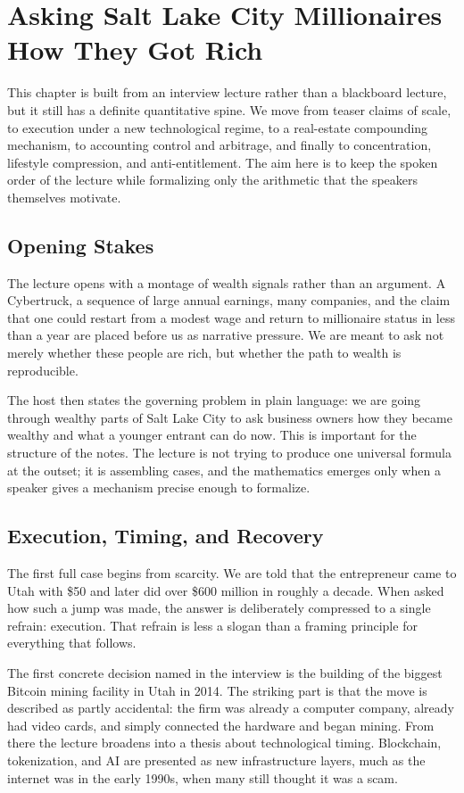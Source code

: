 \chapter{Asking Salt Lake City Millionaires How They Got Rich}

This chapter is built from an interview lecture rather than a blackboard lecture, but it still has a definite quantitative spine. We move from teaser claims of scale, to execution under a new technological regime, to a real-estate compounding mechanism, to accounting control and arbitrage, and finally to concentration, lifestyle compression, and anti-entitlement. The aim here is to keep the spoken order of the lecture while formalizing only the arithmetic that the speakers themselves motivate.

\section{Opening Stakes}

The lecture opens with a montage of wealth signals rather than an argument. A Cybertruck, a sequence of large annual earnings, many companies, and the claim that one could restart from a modest wage and return to millionaire status in less than a year are placed before us as narrative pressure. We are meant to ask not merely whether these people are rich, but whether the path to wealth is reproducible.

The host then states the governing problem in plain language: we are going through wealthy parts of Salt Lake City to ask business owners how they became wealthy and what a younger entrant can do now. This is important for the structure of the notes. The lecture is not trying to produce one universal formula at the outset; it is assembling cases, and the mathematics emerges only when a speaker gives a mechanism precise enough to formalize.

\section{Execution, Timing, and Recovery}

The first full case begins from scarcity. We are told that the entrepreneur came to Utah with \$50 and later did over \$600 million in roughly a decade. When asked how such a jump was made, the answer is deliberately compressed to a single refrain: execution. That refrain is less a slogan than a framing principle for everything that follows.

The first concrete decision named in the interview is the building of the biggest Bitcoin mining facility in Utah in 2014. The striking part is that the move is described as partly accidental: the firm was already a computer company, already had video cards, and simply connected the hardware and began mining. From there the lecture broadens into a thesis about technological timing. Blockchain, tokenization, and AI are presented as new infrastructure layers, much as the internet was in the early 1990s, when many still thought it was a scam.

